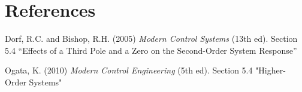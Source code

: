 \documentclass[12pt]{article}
\begin{document}
\section*{References}
\begin{enumerate}[label={[\arabic*]}]
\item Dorf, R.C. and Bishop, R.H. (2005) \textit{Modern Control Systems} (13th ed). Section 5.4 ``Effects of a Third Pole and a Zero on the Second-Order System Response''
\item Ogata, K. (2010) \textit{Modern Control Engineering} (5th ed). Section 5.4 "Higher-Order Systems"
\end{enumerate}
\end{document}
